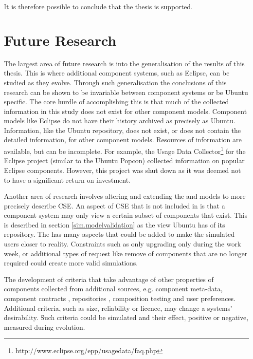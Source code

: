 It is therefore possible to conclude that the thesis is supported.
 
\section{Future Research}
\label{conclusion.futurework}
The largest area of future research is into the generalisation of the results of this thesis.
This is where additional component systems, such as Eclipse, can be studied as they evolve. 
Through such generalisation the conclusions of this research can be shown to be invariable between component systems or be Ubuntu specific.
The core hurdle of accomplishing this is that much of the collected information in this study does not exist for other component models.
Component models like Eclipse do not have their history archived as precisely as Ubuntu.
Information, like the Ubuntu repository, does not exist, or does not contain the detailed information, for other component models.
Resources of information are available, but can be incomplete.
For example, the Usage Data Collector\footnote{http://www.eclipse.org/epp/usagedata/faq.php} for the Eclipse project (similar to the Ubuntu Popcon) collected information on popular Eclipse components. 
However, this project was shut down as it was deemed not to have a significant return on investment. 
 
Another area of research involves altering and extending the \modelname and \usermodel models to more precisely describe CSE.
An aspect of CSE that is not included in \modelname is that a component system may only view a certain subset of components that exist.
This is described in section \ref{sim.modelvalidation} as the view Ubuntu has of its repository.
The \usermodel has many aspects that could be added to make the simulated users closer to reality.
Constraints such as only upgrading only during the work week, 
or additional types of request like remove of components that are no longer required could create more valid simulations.

The development of criteria that take advantage of other properties of components collected from additional sources, e.g. component meta-data, component contracts \citep{Watkins1999}, repositories \citep{Guo2000}, 
composition testing \citep{XuejieZhang2008} and user preferences.
Additional criteria, such as size, reliability or licence, may change a systems' desirability.
Such criteria could be simulated and their effect, positive or negative, measured during evolution.

